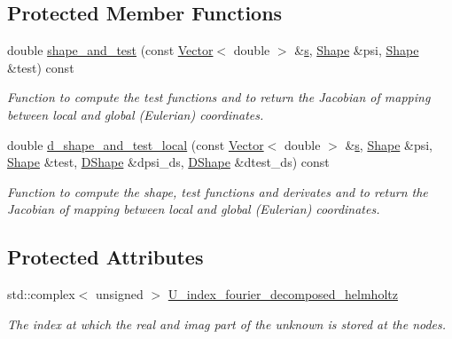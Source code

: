 \subsection*{Protected Member Functions}
\begin{DoxyCompactItemize}
\item 
double \hyperlink{classoomph_1_1FourierDecomposedHelmholtzBCElementBase_a5046a85132dd8fed1199b8c55aeea030}{shape\+\_\+and\+\_\+test} (const \hyperlink{classoomph_1_1Vector}{Vector}$<$ double $>$ \&\hyperlink{cfortran_8h_ab7123126e4885ef647dd9c6e3807a21c}{s}, \hyperlink{classoomph_1_1Shape}{Shape} \&psi, \hyperlink{classoomph_1_1Shape}{Shape} \&test) const
\begin{DoxyCompactList}\small\item\em Function to compute the test functions and to return the Jacobian of mapping between local and global (Eulerian) coordinates. \end{DoxyCompactList}\item 
double \hyperlink{classoomph_1_1FourierDecomposedHelmholtzBCElementBase_a2126f9169af7ef3c8967c0fff4cf1b9e}{d\+\_\+shape\+\_\+and\+\_\+test\+\_\+local} (const \hyperlink{classoomph_1_1Vector}{Vector}$<$ double $>$ \&\hyperlink{cfortran_8h_ab7123126e4885ef647dd9c6e3807a21c}{s}, \hyperlink{classoomph_1_1Shape}{Shape} \&psi, \hyperlink{classoomph_1_1Shape}{Shape} \&test, \hyperlink{classoomph_1_1DShape}{D\+Shape} \&dpsi\+\_\+ds, \hyperlink{classoomph_1_1DShape}{D\+Shape} \&dtest\+\_\+ds) const
\begin{DoxyCompactList}\small\item\em Function to compute the shape, test functions and derivates and to return the Jacobian of mapping between local and global (Eulerian) coordinates. \end{DoxyCompactList}\end{DoxyCompactItemize}
\subsection*{Protected Attributes}
\begin{DoxyCompactItemize}
\item 
std\+::complex$<$ unsigned $>$ \hyperlink{classoomph_1_1FourierDecomposedHelmholtzBCElementBase_a836256b4347acf9f496bc8eff0204866}{U\+\_\+index\+\_\+fourier\+\_\+decomposed\+\_\+helmholtz}
\begin{DoxyCompactList}\small\item\em The index at which the real and imag part of the unknown is stored at the nodes. \end{DoxyCompactList}\end{DoxyCompactItemize}
